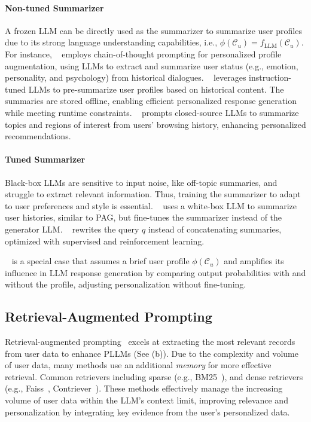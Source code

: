 \paragraph{Non-tuned Summarizer} A frozen LLM can be directly used as the summarizer to summarize user profiles due to its strong language understanding capabilities, i.e., $\mathcal{\phi}\left(\mathcal{C}_u\right) = f_{\text{LLM}}\left(\mathcal{C}_u\right)$. 
For instance, ~\citep{wang2023cue} employs chain-of-thought prompting for personalized profile augmentation, using LLMs to extract and summarize user status (e.g., emotion, personality, and psychology) from historical dialogues. 
~\citep{richardson2023integrating} leverages instruction-tuned LLMs to pre-summarize user profiles based on historical content. The summaries are stored offline, enabling efficient personalized response generation while meeting runtime constraints.
~\citep{DBLP:conf/wsdm/LiuCS024} prompts closed-source LLMs to summarize topics and regions of interest from users' browsing history, enhancing personalized recommendations.


\paragraph{Tuned Summarizer} 
Black-box LLMs are sensitive to input noise, like off-topic summaries, and struggle to extract relevant information. Thus, training the summarizer to adapt to user preferences and style is essential.
~\citep{li2024matryoshka} uses a white-box LLM to summarize user histories, similar to PAG, but fine-tunes the summarizer instead of the generator LLM.
~\citep{li2024learning}  rewrites the query $q$ instead of concatenating summaries, optimized with supervised and reinforcement learning.
 
~\citep{he2024cos} is a special case that assumes a brief user profile $\phi\left(\mathcal{C}_u\right)$ and amplifies its influence in LLM response generation by comparing output probabilities with and without the profile, adjusting personalization without fine-tuning.


\subsection{Retrieval-Augmented Prompting}
\label{subsec:RAG}

Retrieval-augmented prompting~\citep{gao2023retrieval, fan2024survey,qiu2024entropy} excels at extracting the most relevant records from user data to enhance PLLMs (See (b)).
Due to the complexity and volume of user data, many methods use an additional \textit{memory} for more effective retrieval. Common retrievers including sparse (e.g., BM25~\citep{robertson1995okapi}),  and dense retrievers (e.g., Faiss~\citep{johnson2019billion}, Contriever~\citep{izacard2021unsupervised}).
These methods effectively manage the increasing volume of user data within the LLM's context limit, improving relevance and personalization by integrating key evidence from the user's personalized data.


